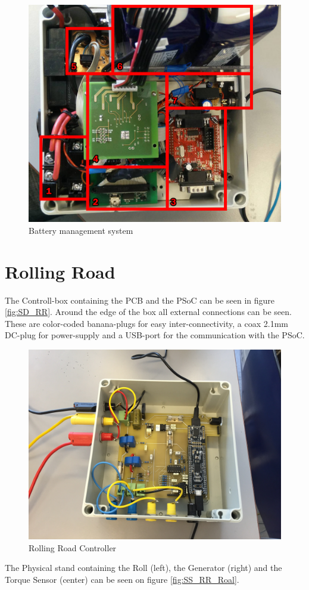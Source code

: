 \begin{figure}[H]
	\centering
	\includegraphics[width=0.7\linewidth]{SubPages/Images/SD_BMS}
	\caption{Battery management system}
	\label{fig:SD_BMS}
\end{figure}

\section{Rolling Road}
The Controll-box containing the PCB and the PSoC can be seen in figure \vref{fig:SD_RR}. Around the edge of the box all external connections can be seen. These are color-coded banana-plugs for easy inter-connectivity, a coax 2.1mm DC-plug for power-supply and a USB-port for the communication with the PSoC. 

\begin{figure}[H]
	\centering
	\includegraphics[width=0.7\linewidth]{SubPages/Images/SD_RR}
	\caption{Rolling Road Controller}
	\label{fig:SD_RR}
\end{figure}

\newpage
The Physical stand containing the Roll (left), the Generator (right) and the Torque Sensor (center) can be seen on figure \vref{fig:SS_RR_Roal}.


